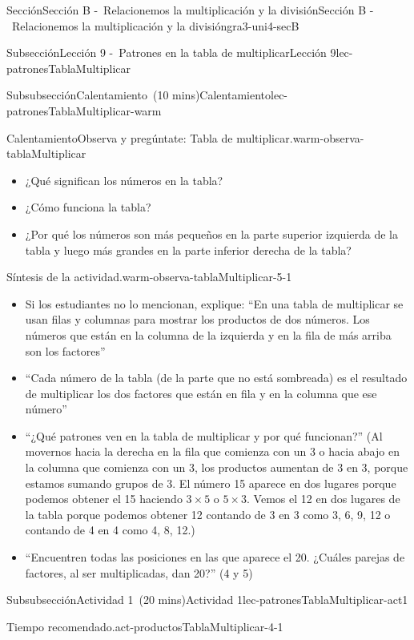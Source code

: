 \documentclass[oneside,10pt,]{article}
\begin{document}
\begin{sectionptx}{Sección}{Sección B -~Relacionemos la multiplicación y la división}{}{Sección B -~Relacionemos la multiplicación y la división}{}{}{gra3-uni4-secB}
\begin{subsectionptx}{Subsección}{Lección 9 -~Patrones en la tabla de multiplicar}{}{Lección 9}{}{}{lec-patronesTablaMultiplicar}
\begin{subsubsectionptx}{Subsubsección}{Calentamiento~(10 mins)}{}{Calentamiento}{}{}{lec-patronesTablaMultiplicar-warm}
\begin{exploration}{Calentamiento}{Observa y pregúntate: Tabla de multiplicar.}{warm-observa-tablaMultiplicar}
%
\begin{itemize}[label=\textbullet]
\item{}¿Qué significan los números en la tabla?%
\item{}¿Cómo funciona la tabla?%
\item{}¿Por qué los números son más pequeños en la parte superior izquierda de la tabla y luego más grandes en la parte inferior derecha de la tabla?%
\end{itemize}
\end{exploration}%
\par
\begin{paragraphs}{Síntesis de la actividad.}{warm-observa-tablaMultiplicar-5-1}%
%
\begin{itemize}[label=\textbullet]
\item{}Si los estudiantes no lo mencionan, explique: ``En una tabla de multiplicar se usan filas y columnas para mostrar los productos de dos números. Los números que están en la columna de la izquierda y en la fila de más arriba son los factores''%
\item{}``Cada número de la tabla (de la parte que no está sombreada) es el resultado de multiplicar los dos factores que están en fila y en la columna que ese número''%
\item{}``¿Qué patrones ven en la tabla de multiplicar y por qué funcionan?'' (Al movernos hacia la derecha en la fila que comienza con un 3 o hacia abajo en la columna que comienza con un 3, los productos aumentan de 3 en 3, porque estamos sumando grupos de 3. El número 15 aparece en dos lugares porque podemos obtener el 15 haciendo \(3 \times 5\) o \(5 \times 3\). Vemos el 12 en dos lugares de la tabla porque podemos obtener 12 contando de 3 en 3 como 3, 6, 9, 12 o contando de 4 en 4 como 4, 8, 12.)%
\item{}``Encuentren todas las posiciones en las que aparece el 20. ¿Cuáles parejas de factores, al ser multiplicadas, dan 20?'' (4 y 5)%
\end{itemize}
\end{paragraphs}%
\end{subsubsectionptx}
%
%
\typeout{************************************************}
\typeout{************************************************}
%
\begin{subsubsectionptx}{Subsubsección}{Actividad 1~(20 mins)}{}{Actividad 1}{}{}{lec-patronesTablaMultiplicar-act1}
\par
\begin{paragraphs}{Tiempo recomendado.}{act-productosTablaMultiplicar-4-1}%

\end{paragraphs}
\end{subsubsectionptx}
\end{subsectionptx}
\end{sectionptx}
\end{document}
